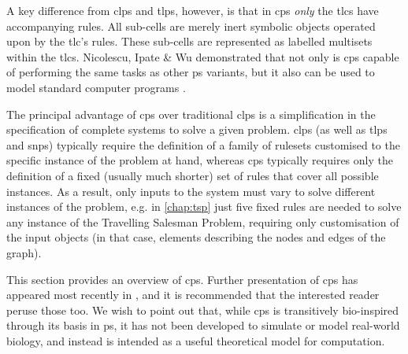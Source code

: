 A key difference from \gls{clps} and \gls{tlps}, however, is that in \gls{cps} \emph{only} the \glspl{tlc} have accompanying rules.  All sub-cells are merely inert symbolic objects operated upon by the \gls{tlc}'s rules.  These sub-cells are represented as labelled multisets within the \glspl{tlc}.  Nicolescu, Ipate \& Wu demonstrated that not only is \gls{cps} capable of performing the same tasks as other \gls{ps} variants, but it also can be used to model standard computer programs \cite{Nicolescu2014a}.

The principal advantage of \gls{cps} over traditional \gls{clps} is a simplification in the specification of complete systems to solve a given problem.  \Gls{clps} (as well as \gls{tlps} and \gls{snps}) typically require the definition of a family of rulesets customised to the specific instance of the problem at hand, whereas \gls{cps} typically requires only the definition of a fixed (usually much shorter) set of rules that cover all possible instances. As a result, only inputs to the system must vary to solve different instances of the problem, e.g. in \autoref{chap:tsp} just five fixed rules are needed to solve any instance of the Travelling Salesman Problem, requiring only customisation of the input objects (in that case, elements describing the nodes and edges of the graph).

This section provides an overview of \gls{cps}.  Further presentation of \gls{cps} has appeared most recently in \cite{Nicolescu2018,Henderson2019,Henderson2020,Liu2020,Liu2020a}, and it is recommended that the interested reader peruse those too.  We wish to point out that, while \gls{cps} is transitively bio-inspired through its basis in \gls{ps}, it has not been developed to simulate or model real-world biology, and instead is intended as a useful theoretical model for computation.

% 
% 



